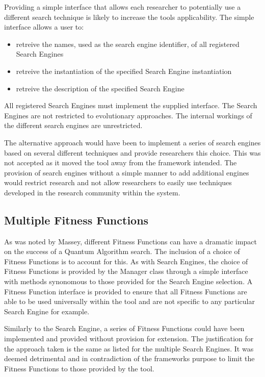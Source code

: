 Providing a simple interface that allows each researcher to potentially use a different search technique is likely to increase the tools applicability.
The simple interface allows a user to:
\begin{itemize}
 \item retreive the names, used as the search engine identifier, of all registered Search Engines
 \item retreive the instantiation of the specified Search Engine instantiation
 \item retreive the description of the specified Search Engine
\end{itemize}

All registered Search Engines must implement the supplied interface.
The Search Engines are not restricted to evolutionary approaches.
The internal workings of the different search engines are unrestricted.

The alternative approach would have been to implement a series of search engines based on several different techniques and provide researchers this choice.
This was not accepted as it moved the tool away from the framework intended.
The provision of search engines without a simple manner to add additional engines would restrict research and not allow researchers to easily use techniques developed in the research community within the system.

\subsection{Multiple Fitness Functions}
As was noted by Massey\cite{masseythesis}, different Fitness Functions can have a dramatic impact on the success of a Quantum Algorithm search.
The inclusion of a choice of Fitness Functions is to account for this.
As with Search Engines, the choice of Fitness Functions is provided by the Manager class through a simple interface with methods synonomous to those provided for the Search Engine selection.
A Fitness Function interface is provided to ensure that all Fitness Functions are able to be used universally within the tool and are not specific to any particular Search Engine for example.

Similarly to the Search Engine, a series of Fitness Functions could have been implemented and provided without provision for extension.
The justification for the approach taken is the same as listed for the multiple Search Engines.
It was deemed detrimental and in contradiction of the frameworks purpose to limit the Fitness Functions to those provided by the tool.


